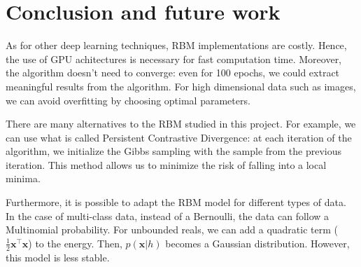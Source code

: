 \documentclass{article}
\begin{document}
\clearpage
\section{Conclusion and future work}

As for other deep learning techniques, RBM implementations are costly. Hence, the use of GPU achitectures is necessary for fast computation time. Moreover, the algorithm doesn't need to converge: even for 100 epochs, we could extract meaningful results from the algorithm. For high dimensional data such as images, we can avoid overfitting by choosing optimal parameters.

There are many alternatives to the RBM studied in this project. For example, we can use what is called Persistent Contrastive Divergence: at each iteration of the algorithm, we initialize the Gibbs sampling with the sample from the previous iteration. This method allows us to minimize the risk of falling into a local minima.

Furthermore, it is possible to adapt the RBM model for different types of data. In the case of multi-class data, instead of a Bernoulli, the data can follow a Multinomial probability. For unbounded reals, we can add a quadratic term ($\frac{1}{2}\mathbf{x}^\top \mathbf{x}$) to the energy. Then, $p(\mathbf{x}|h)$ becomes a Gaussian distribution. However, this model is less stable.


\clearpage
\nocite{*}


\end{document}
